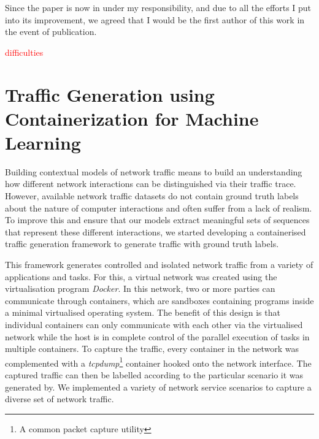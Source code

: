 \documentclass[a4paper,12pt,twoside]{report}
\begin{document}
Since the paper is now in under my responsibility, and due to all the efforts I put into its improvement, we agreed that I would be the first author of this work in the event of publication. 

\textcolor{red}{difficulties}
\cite{sommer_outside_2010}

\chapter{Traffic Generation using Containerization for Machine Learning}

Building contextual models of network traffic means to build an understanding how different network interactions can be distinguished via their traffic trace. However, available network traffic datasets do not contain ground truth labels about the nature of computer interactions and often suffer from a lack of realism. To improve this and ensure that our models extract meaningful sets of sequences that represent these different interactions, we started developing a containerised traffic generation framework to generate traffic with ground truth labels. 


This framework generates controlled and isolated network traffic from a variety of applications and tasks. For this, a virtual network was created using the virtualisation program \textit{Docker}. In this network, two or more parties can communicate through containers,  which are sandboxes containing programs inside a minimal virtualised operating system. The benefit of this design is that individual containers can only communicate with each other via the virtualised network while the host is in complete control of the parallel execution of tasks in multiple containers. To capture the traffic, every container in the network was complemented with a \textit{tcpdump}\footnote{A common packet capture utility} container hooked onto the network interface. The captured traffic can then be labelled according to the particular scenario it was generated by. We implemented a variety of network service  scenarios to capture a diverse set of network traffic.
\end{document}
